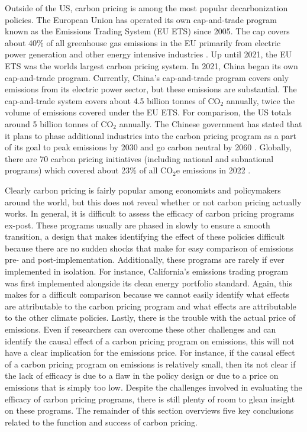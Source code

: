 Outside of the US, carbon pricing is among the most popular decarbonization policies. The European Union has operated its own cap-and-trade program known as the Emissions Trading System (EU ETS) since 2005. The cap covers about 40\% of all greenhouse gas emissions in the EU primarily from electric power generation and other energy intensive industries \citep{eu_ets_overview}. Up until 2021, the EU ETS was the worlds largest carbon pricing system. In 2021, China began its own cap-and-trade program. Currently, China's cap-and-trade program covers only emissions from its electric power sector, but these emissions are substantial. The cap-and-trade system covers about 4.5 billion tonnes of CO$_2$ annually, twice the volume of emissions covered under the EU ETS. For comparison, the US totals around 5 billion tonnes of CO$_2$ annually. The Chinese government has stated that it plans to phase additional industries into the carbon pricing program as a part of its goal to peak emissions by 2030 and go carbon neutral by 2060 \citep{icap_report}. Globally, there are 70 carbon pricing initiatives (including national and subnational programs) which covered about 23\% of all CO$_2$e emissions in 2022 \citep{wbank}. 

Clearly carbon pricing is fairly popular among economists and policymakers around the world, but this does not reveal whether or not carbon pricing actually works. In general, it is difficult to assess the efficacy of carbon pricing programs ex-post. These programs usually are phased in slowly to ensure a smooth transition, a design that makes identifying the effect of these policies difficult because there are no sudden shocks that make for easy comparison of emissions pre- and post-implementation. Additionally, these programs are rarely if ever implemented in isolation. For instance, California's emissions trading program was first implemented alongside its clean energy portfolio standard. Again, this makes for a difficult comparison because we cannot easily identify what effects are attributable to the carbon pricing program and what effects are attributable to the other climate policies. Lastly, there is the trouble with the actual price of emissions. Even if researchers can overcome these other challenges and can identify the causal effect of a carbon pricing program on emissions, this will not have a clear implication for the emissions price. For instance, if the causal effect of a carbon pricing program on emissions is relatively small, then its not clear if the lack of efficacy is due to a flaw in the policy design or due to a price on emissions that is simply too low. Despite the challenges involved in evaluating the efficacy of carbon pricing programs, there is still plenty of room to glean insight on these programs. The remainder of this section overviews five key conclusions related to the function and success of carbon pricing. 

